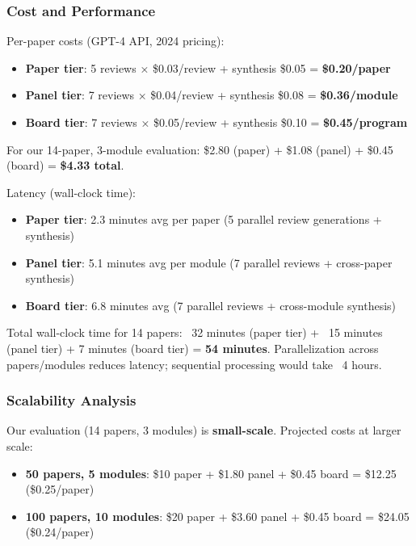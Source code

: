 \subsubsection{Cost and Performance}

Per-paper costs (GPT-4 API, 2024 pricing):
\begin{itemize}
\item \textbf{Paper tier}: 5 reviews × \$0.03/review + synthesis \$0.05 = \textbf{\$0.20/paper}
\item \textbf{Panel tier}: 7 reviews × \$0.04/review + synthesis \$0.08 = \textbf{\$0.36/module}
\item \textbf{Board tier}: 7 reviews × \$0.05/review + synthesis \$0.10 = \textbf{\$0.45/program}
\end{itemize}

For our 14-paper, 3-module evaluation: \$2.80 (paper) + \$1.08 (panel) + \$0.45 (board) = \textbf{\$4.33 total}.

Latency (wall-clock time):
\begin{itemize}
\item \textbf{Paper tier}: 2.3 minutes avg per paper (5 parallel review generations + synthesis)
\item \textbf{Panel tier}: 5.1 minutes avg per module (7 parallel reviews + cross-paper synthesis)
\item \textbf{Board tier}: 6.8 minutes avg (7 parallel reviews + cross-module synthesis)
\end{itemize}

Total wall-clock time for 14 papers: ~32 minutes (paper tier) + ~15 minutes (panel tier) + 7 minutes (board tier) = \textbf{54 minutes}. Parallelization across papers/modules reduces latency; sequential processing would take ~4 hours.

\subsubsection{Scalability Analysis}

Our evaluation (14 papers, 3 modules) is \textbf{small-scale}. Projected costs at larger scale:
\begin{itemize}
\item \textbf{50 papers, 5 modules}: \$10 paper + \$1.80 panel + \$0.45 board = \$12.25 (\$0.25/paper)
\item \textbf{100 papers, 10 modules}: \$20 paper + \$3.60 panel + \$0.45 board = \$24.05 (\$0.24/paper)
\end{itemize}

